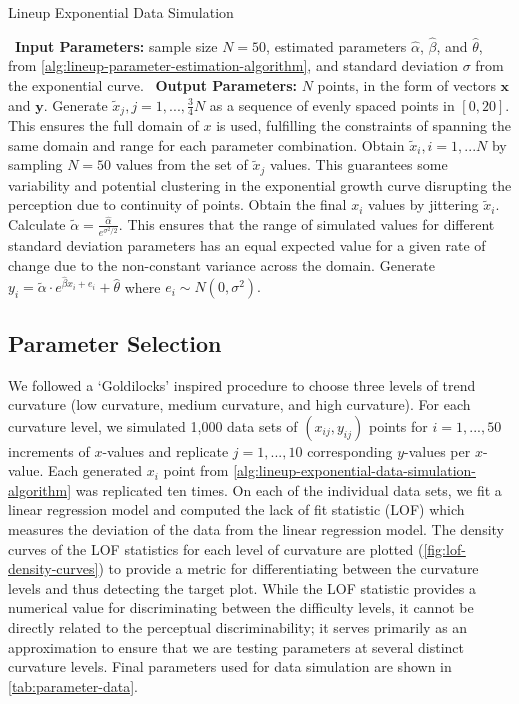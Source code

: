 \documentclass[12pt]{article}
\begin{document}
\begin{algorithm}
  \caption{Lineup Exponential Data Simulation}\label{alg:lineup-exponential-data-simulation-algorithm}
  \begin{algorithmic}[1]
    \Statex \textbullet~\textbf{Input Parameters:} sample size $N = 50$, estimated parameters $\hat\alpha$, $\hat\beta$, and $\hat\theta$, from \cref{alg:lineup-parameter-estimation-algorithm}, and standard deviation $\sigma$ from the exponential curve.
    \Statex \textbullet~\textbf{Output Parameters:} $N$ points, in the form of vectors $\mathbf{x}$ and $\mathbf{y}$.
    \State Generate $\tilde x_j, j = 1,..., \frac{3}{4}N$ as a sequence of evenly spaced points in $[0,20]$. This ensures the full domain of $x$ is used, fulfilling the constraints of spanning the same domain and range for each parameter combination.
    \State Obtain $\tilde x_i, i = 1,...N$ by sampling $N = 50$ values from the set of $\tilde x_j$ values. This guarantees some variability and potential clustering in the exponential growth curve disrupting the perception due to continuity of points.
    \State Obtain the final $x_i$ values by jittering $\tilde x_i$.
    \State Calculate $\tilde\alpha = \frac{\hat\alpha}{e^{\sigma^2/2}}.$ This ensures that the range of simulated values for different standard deviation parameters has an equal expected value for a given rate of change due to the non-constant variance across the domain.
    \State Generate $y_i = \tilde\alpha\cdot e^{\hat\beta x_i + e_i}+\hat\theta$ where $e_i\sim N(0,\sigma^2).$
  \end{algorithmic}
\end{algorithm}

\hypertarget{lineups-parameter-selection}{%
\subsection{Parameter Selection}\label{lineups-parameter-selection}}

We followed a `Goldilocks' inspired procedure to choose three levels of
trend curvature (low curvature, medium curvature, and high curvature).
For each curvature level, we simulated 1,000 data sets of
\((x_{ij}, y_{ij})\) points for \(i = 1,...,50\) increments of
\(x\)-values and replicate \(j = 1,...,10\) corresponding \(y\)-values
per \(x\)-value. Each generated \(x_i\) point from
\cref{alg:lineup-exponential-data-simulation-algorithm} was replicated
ten times. On each of the individual data sets, we fit a linear
regression model and computed the lack of fit statistic (LOF) which
measures the deviation of the data from the linear regression model. The
density curves of the LOF statistics for each level of curvature are
plotted (\cref{fig:lof-density-curves}) to provide a metric for
differentiating between the curvature levels and thus detecting the
target plot. While the LOF statistic provides a numerical value for
discriminating between the difficulty levels, it cannot be directly
related to the perceptual discriminability; it serves primarily as an
approximation to ensure that we are testing parameters at several
distinct curvature levels. Final parameters used for data simulation are
shown in \cref{tab:parameter-data}.
\end{document}

